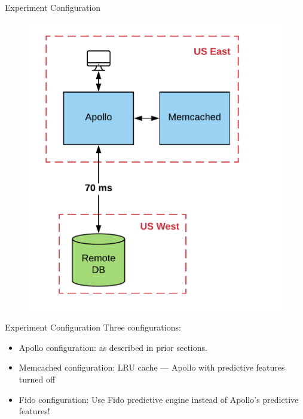 \documentclass[10pt]{beamer}
\begin{document}
\begin{frame}[fragile]{Experiment Configuration}
    \begin{figure}
        \center
        \includegraphics[scale=0.17]{apollo_exp_config}
    \end{figure}
\end{frame}

\begin{frame}[fragile]{Experiment Configuration}
    Three configurations:
    \begin{itemize}
        \item{\alert{Apollo configuration:} as described in prior sections.}
        \item{\alert{Memcached configuration:} LRU cache --- Apollo with predictive features turned off}
        \item{\alert{Fido configuration:} Use Fido predictive engine instead of Apollo's predictive features!}
    \end{itemize}
\end{frame}
\end{document}
